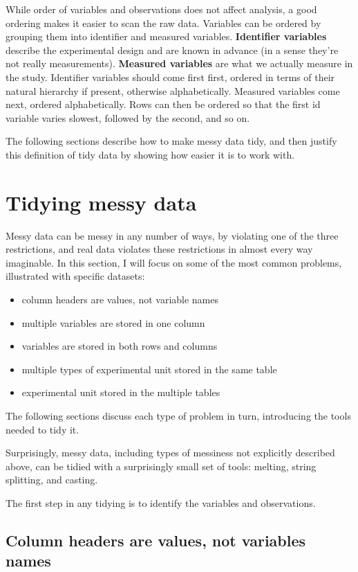 \documentclass[oneside]{article}
\begin{document}
While order of variables and observations does not affect analysis, a good ordering makes it easier to scan the raw data. Variables can be ordered by grouping them into identifier and measured variables. \textbf{Identifier variables} describe the experimental design and are known in advance (in a sense they're not really measurements). \textbf{Measured variables} are what we actually measure in the study. Identifier variables should come first first, ordered in terms of their natural hierarchy if present, otherwise alphabetically. Measured variables come next, ordered alphabetically. Rows can then be ordered so that the first id variable varies slowest, followed by the second, and so on.

The following sections describe how to make messy data tidy, and then justify this definition of tidy data by showing how easier it is to work with.

\section{Tidying messy data}

Messy data can be messy in any number of ways, by violating one of the three restrictions, and real data violates these restrictions in almost every way imaginable. In this section, I will focus on some of the most common problems, illustrated with specific datasets:

\begin{itemize}
  \item column headers are values, not variable names
  \item multiple variables are stored in one column
  \item variables are stored in both rows and columns
  \item multiple types of experimental unit stored in the same table
  \item experimental unit stored in the multiple tables
\end{itemize}

The following sections discuss each type of problem in turn, introducing the tools needed to tidy it.

Surprisingly, messy data, including types of messiness not explicitly described above, can be tidied with a surprisingly small set of tools: melting, string splitting, and casting. 

The first step in any tidying is to identify the variables and observations. 

\subsection{Column headers are values, not variables names}
\end{document}
